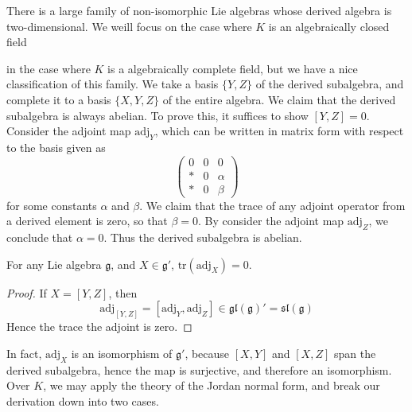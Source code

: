 There is a large family of non-isomorphic Lie algebras whose derived algebra is two-dimensional. We weill focus on the case where $K$ is an algebraically closed field

in the case where $K$ is a algebraically complete field, but we have a nice classification of this family. We take a basis $\{ Y,Z \}$ of the derived subalgebra, and complete it to a basis $\{ X,Y,Z \}$ of the entire algebra. We claim that the derived subalgebra is always abelian. To prove this, it suffices to show $[Y,Z] = 0$. Consider the adjoint map $\text{adj}_Y$, which can be written in matrix form with respect to the basis given as
%
\[ \begin{pmatrix} 0 & 0 & 0 \\ * & 0 & \alpha \\ * & 0 & \beta \end{pmatrix} \]
%
for some constants $\alpha$ and $\beta$. We claim that the trace of any adjoint operator from a derived element is zero, so that $\beta = 0$. By consider the adjoint map $\text{adj}_Z$, we conclude that $\alpha = 0$. Thus the derived subalgebra is abelian.

\begin{lemma}
    For any Lie algebra $\mathfrak{g}$, and $X \in \mathfrak{g}'$, $\text{tr}(\text{adj}_X) = 0$.
\end{lemma}
\begin{proof}
    If $X = [Y,Z]$, then
    \[ \text{adj}_{[Y,Z]} = [\text{adj}_Y, \text{adj}_Z] \in \mathfrak{gl}(\mathfrak{g})' = \mathfrak{sl}(\mathfrak{g}) \]
    Hence the trace the adjoint is zero.
\end{proof}

In fact, $\text{adj}_X$ is an isomorphism of $\mathfrak{g}'$, because $[X,Y]$ and $[X,Z]$ span the derived subalgebra, hence the map is surjective, and therefore an isomorphism. Over $K$, we may apply the theory of the Jordan normal form, and break our derivation down into two cases.


